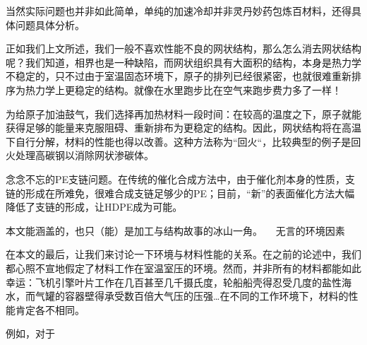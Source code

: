 当然实际问题也并非如此简单，单纯的加速冷却并非灵丹妙药包炼百材料，还得具体问题具体分析。

正如我们上文所述，我们一般不喜欢性能不良的网状结构，那么怎么消去网状结构呢？我们知道，相界也是一种缺陷，而网状组织具有大面积的结构，本身是热力学不稳定的，只不过由于室温固态环境下，原子的排列已经很紧密，也就很难重新排序为热力学上更稳定的结构。就像在水里跑步比在空气来跑步费力多了一样！

为给原子加油鼓气，我们选择再加热材料一段时间：在较高的温度之下，原子就能获得足够的能量来克服阻碍、重新排布为更稳定的结构。因此，网状结构将在高温下自行分解，材料的性能也得以改善。这种方法称为“回火“，比较典型的例子是回火处理高碳钢以消除网状渗碳体。

念念不忘的PE支链问题。在传统的催化合成方法中，由于催化剂本身的性质，支链的形成在所难免，很难合成支链足够少的PE；目前，“新”的表面催化方法大幅降低了支链的形成，让HDPE成为可能。

本文能涵盖的，也只（能）是加工与结构故事的冰山一角。 
无言的环境因素

在本文的最后，让我们来讨论一下环境与材料性能的关系。在之前的论述中，我们都心照不宣地假定了材料工作在室温室压的环境。然而，并非所有的材料都能如此幸运：飞机引擎叶片工作在几百甚至几千摄氏度，轮船船壳得忍受几度的盐性海水，而气罐的容器壁得承受数百倍大气压的压强…在不同的工作环境下，材料的性能肯定各不相同。

例如，对于

